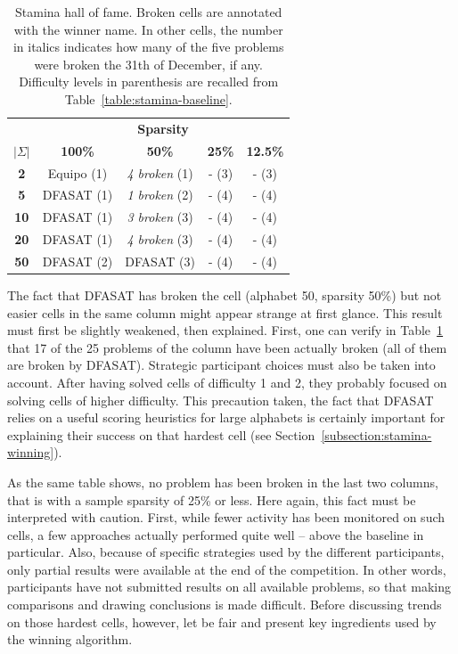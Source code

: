 \begin{table}
\begin{center}
\begin{tabular}{c|c c c c}
&\multicolumn{4}{|c}{\textbf{Sparsity}}\\ 
\textbf{$|\Sigma|$} & \textbf{100\%} & \textbf{50\%} & \textbf{25\%} & \textbf{12.5\%}\\
\hline
\textbf{2}  & Equipo (1) & \emph{4 broken} (1)  & - (3) & - (3) \\
\textbf{5}  & DFASAT (1) & \emph{1 broken} (2)  & - (4) & - (4) \\
\textbf{10} & DFASAT (1) & \emph{3 broken} (3)  & - (4) & - (4) \\
\textbf{20} & DFASAT (1) & \emph{4 broken} (3)  & - (4) & - (4) \\
\textbf{50} & DFASAT (2) & DFASAT (3) & - (4) & - (4) \\
\end{tabular}
\end{center}
\caption{Stamina hall of fame. Broken cells are annotated with the winner name. In other cells, the number in italics indicates how many of the five problems were broken the 31th of December, if any. Difficulty levels in parenthesis are recalled from Table~\ref{table:stamina-baseline}.\label{table:stamina-hall-of-fame}}
\end{table}

The fact that DFASAT has broken the cell (alphabet 50, sparsity 50\%) but not easier cells in the same column might appear strange at first glance. This result must first be slightly weakened, then explained. First, one can verify in Table~\ref{table:stamina-hall-of-fame} that 17 of the 25 problems of the column have been actually broken (all of them are broken by DFASAT). Strategic participant choices must also be taken into account. After having solved cells of difficulty 1 and 2, they probably focused on solving cells of higher difficulty. This precaution taken, the fact that DFASAT relies on a useful scoring heuristics for large alphabets is certainly important for explaining their success on that hardest cell (see Section~\ref{subsection:stamina-winning}).

As the same table shows, no problem has been broken in the last two columns, that is with a sample sparsity of 25\% or less. Here again, this fact must be interpreted with caution. First, while fewer activity has been monitored on such cells, a few approaches actually performed quite well -- above the baseline in particular. Also, because of specific strategies used by the different participants, only partial results were available at the end of the competition. In other words, participants have not submitted results on all available problems, so that making comparisons and drawing conclusions is made difficult. Before discussing trends on those hardest cells, however, let be fair and present key ingredients used by the winning algorithm.

